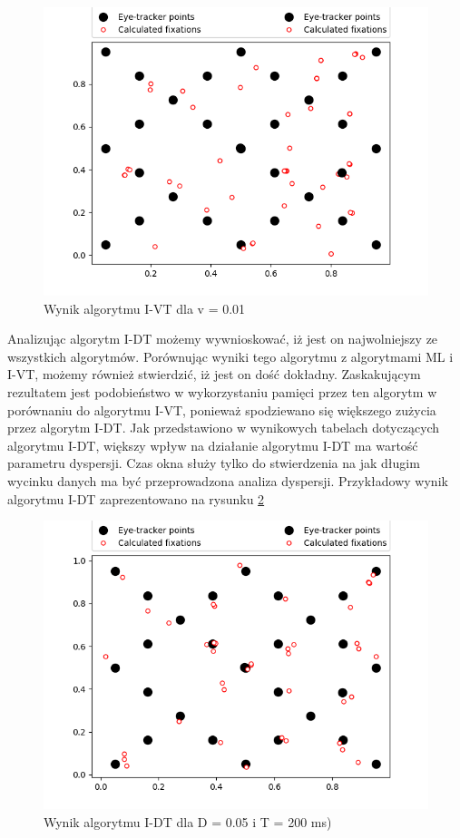 \begin{figure}[H]
    \centering
    \captionsetup{justification=centering,margin=2cm}
    \includegraphics[width=0.8\linewidth]{resources/ivtresults/file4.png}
    \caption{Wynik algorytmu I-VT dla v = 0.01}
    \label{fig:ivt4}
\end{figure}
Analizując algorytm I-DT możemy wywnioskować, iż jest on najwolniejszy ze wszystkich algorytmów. Porównując wyniki tego algorytmu z algorytmami ML i I-VT, możemy również stwierdzić, iż jest on dość dokładny. Zaskakującym rezultatem jest podobieństwo w wykorzystaniu pamięci przez ten algorytm w porównaniu do algorytmu I-VT, ponieważ spodziewano się większego zużycia przez algorytm I-DT. Jak przedstawiono w wynikowych tabelach dotyczących algorytmu I-DT, większy wpływ na działanie algorytmu I-DT ma wartość parametru dyspersji. Czas okna służy tylko do stwierdzenia na jak długim wycinku danych ma być przeprowadzona analiza dyspersji. Przykładowy wynik algorytmu I-DT zaprezentowano na rysunku \ref{fig:idtresult}\par
\begin{figure}[H]
    \centering
    \captionsetup{justification=centering,margin=2cm}
    \includegraphics[width=0.8\linewidth]{resources/idt/idt-disp.png}
    \caption{Wynik algorytmu I-DT dla D = 0.05 i T = 200 ms)}
    \label{fig:idtresult}
\end{figure}
